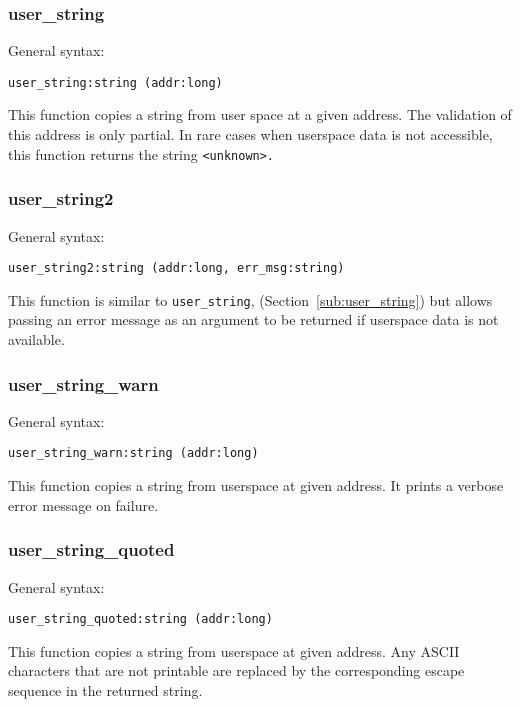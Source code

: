 \documentclass[twoside,english]{article}
\newenvironment{vindent}
{\begin{list}{}{\setlength{\listparindent}{6pt}}
\item[]}
{\end{list}}
\begin{document}
\subsubsection{user\_string\label{sub:user_string}}
General syntax:

\begin{vindent}
\begin{verbatim}
user_string:string (addr:long)
\end{verbatim}
\end{vindent}
This function copies a string from user space at a given address. The validation
of this address is only partial. In rare cases when userspace data is not
accessible, this function returns the string \texttt{<unknown>.}


\subsubsection{user\_string2}
General syntax:

\begin{vindent}
\begin{verbatim}
user_string2:string (addr:long, err_msg:string)
\end{verbatim}
\end{vindent}
This function is similar to \texttt{user\_string}, (Section~\ref{sub:user_string})
but allows passing an error message as an argument to be returned if userspace
data is not available.


\subsubsection{user\_string\_warn}
General syntax:

\begin{vindent}
\begin{verbatim}
user_string_warn:string (addr:long)
\end{verbatim}
\end{vindent}
This function copies a string from userspace at given address. It prints
a verbose error message on failure.


\subsubsection{user\_string\_quoted}
General syntax:

\begin{vindent}
\begin{verbatim}
user_string_quoted:string (addr:long)
\end{verbatim}
\end{vindent}
This function copies a string from userspace at given address. Any ASCII
characters that are not printable are replaced by the corresponding escape
sequence in the returned string. 
\end{document}
